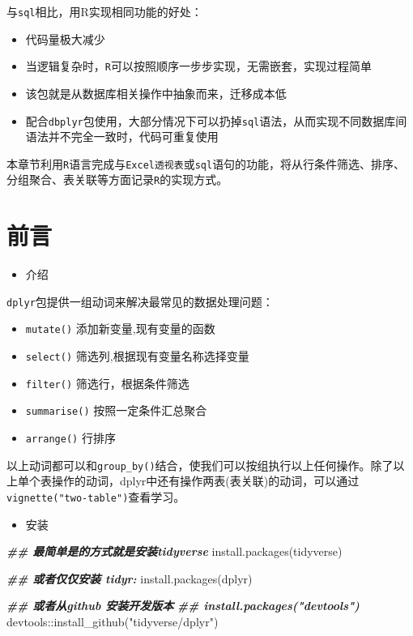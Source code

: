 \documentclass[
]{book}
\newenvironment{Shaded}{\begin{snugshade}}{\end{snugshade}}
\newcommand{\DocumentationTok}[1]{\textcolor[rgb]{0.56,0.35,0.01}{\textbf{\textit{#1}}}}
\newcommand{\FunctionTok}[1]{\textcolor[rgb]{0.00,0.00,0.00}{#1}}
\newcommand{\NormalTok}[1]{#1}
\newcommand{\SpecialCharTok}[1]{\textcolor[rgb]{0.00,0.00,0.00}{#1}}
\newcommand{\StringTok}[1]{\textcolor[rgb]{0.31,0.60,0.02}{#1}}
\providecommand{\tightlist}{%
  \setlength{\itemsep}{0pt}\setlength{\parskip}{0pt}}
\begin{document}
与\texttt{sql}相比，用R实现相同功能的好处：

\begin{itemize}
\item
  代码量极大减少
\item
  当逻辑复杂时，\texttt{R}可以按照顺序一步步实现，无需嵌套，实现过程简单
\item
  该包就是从数据库相关操作中抽象而来，迁移成本低
\item
  配合\texttt{dbplyr}包使用，大部分情况下可以扔掉\texttt{sql}语法，从而实现不同数据库间语法并不完全一致时，代码可重复使用
\end{itemize}

本章节利用\texttt{R}语言完成与\texttt{Excel透视表}或\texttt{sql}语句的功能，将从行条件筛选、排序、分组聚合、表关联等方面记录\texttt{R}的实现方式。

\hypertarget{ux524dux8a00}{%
\section{前言}\label{ux524dux8a00}}

\begin{itemize}
\tightlist
\item
  介绍
\end{itemize}

\texttt{dplyr}包提供一组动词来解决最常见的数据处理问题：

\begin{itemize}
\item
  \texttt{mutate()} 添加新变量,现有变量的函数
\item
  \texttt{select()} 筛选列,根据现有变量名称选择变量
\item
  \texttt{filter()} 筛选行，根据条件筛选
\item
  \texttt{summarise()} 按照一定条件汇总聚合
\item
  \texttt{arrange()} 行排序
\end{itemize}

以上动词都可以和\texttt{group\_by()}结合，使我们可以按组执行以上任何操作。除了以上单个表操作的动词，dplyr中还有操作两表(表关联)的动词，可以通过\texttt{vignette("two-table")}查看学习。

\begin{itemize}
\tightlist
\item
  安装
\end{itemize}

\begin{Shaded}
\begin{Highlighting}[]
\DocumentationTok{\#\# 最简单是的方式就是安装tidyverse}
\FunctionTok{install.packages}\NormalTok{(}\StringTok{\textquotesingle{}tidyverse\textquotesingle{}}\NormalTok{)}

\DocumentationTok{\#\# 或者仅仅安装 tidyr:}
\FunctionTok{install.packages}\NormalTok{(}\StringTok{\textquotesingle{}dplyr\textquotesingle{}}\NormalTok{)}

\DocumentationTok{\#\# 或者从github 安装开发版本}
\DocumentationTok{\#\# install.packages("devtools")}
\NormalTok{devtools}\SpecialCharTok{::}\FunctionTok{install\_github}\NormalTok{(}\StringTok{"tidyverse/dplyr"}\NormalTok{)}
\end{Highlighting}
\end{Shaded}
\end{document}
